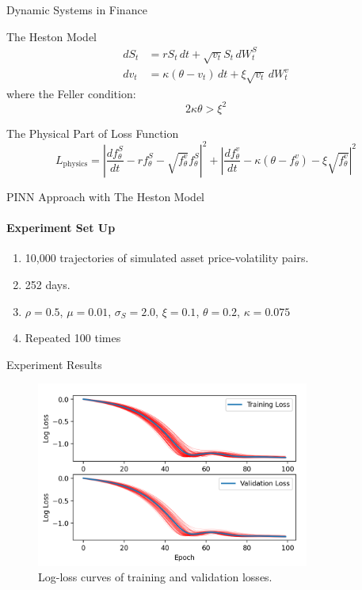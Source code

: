 \begin{frame}{Dynamic Systems in Finance}
    \begin{block}{The Heston Model}
        \begin{align}
            dS_t &= r S_t \, dt + \sqrt{v_t} S_t \, dW_t^S \\
            dv_t &= \kappa (\theta - v_t) \, dt + \xi \sqrt{v_t} \, dW_t^v
        \end{align}
        where the Feller condition:
        \begin{equation}
            2 \kappa \theta > \xi^2
        \end{equation}
    \end{block}

    \begin{block}{The Physical Part of Loss Function}
        \begin{equation}
            L_{\text{physics}} = \left| \frac{d f_{\theta}^S}{dt} - r f_{\theta}^S - \sqrt{f_{\theta}^v} f_{\theta}^S \right|^2 + \left| \frac{d f_{\theta}^v}{dt} - \kappa (\theta - f_{\theta}^v) - \xi \sqrt{f_{\theta}^v} \right|^2
        \end{equation}
    \end{block}
\end{frame}

\begin{frame}{PINN Approach with The Heston Model}
\framesubtitle{Experiment Set Up}
    \begin{enumerate}
        \item 10,000 trajectories of simulated asset price-volatility pairs.
        \item 252 days.
        \item \(\rho = 0.5\), \(\mu = 0.01\), \(\sigma_S = 2.0\), \(\xi = 0.1\), \(\theta = 0.2\), \(\kappa = 0.075\)
        \item Repeated 100 times
    \end{enumerate}
\end{frame}

\begin{frame}{Experiment Results}
    \begin{figure}[H]
        \centering
        \includegraphics[width=0.8\textwidth]{img/png3.png}
        \caption{Log-loss curves of training and validation losses.}
        \label{fig:log_loss}
    \end{figure}
\end{frame}

